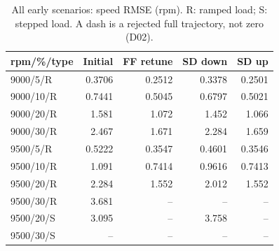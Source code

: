 \begin{table}[htbp]\centering\small\setlength{\tabcolsep}{4pt}\begin{tabular}{@{}lrrrr@{}}\toprule
rpm/\%/type & Initial & FF retune & SD down & SD up\\\midrule
9000/5/R & 0.3706 & 0.2512 & 0.3378 & 0.2501\\
9000/10/R & 0.7441 & 0.5045 & 0.6797 & 0.5021\\
9000/20/R & 1.581 & 1.072 & 1.452 & 1.066\\
9000/30/R & 2.467 & 1.671 & 2.284 & 1.659\\
9500/5/R & 0.5222 & 0.3547 & 0.4601 & 0.3546\\
9500/10/R & 1.091 & 0.7414 & 0.9616 & 0.7413\\
9500/20/R & 2.284 & 1.552 & 2.012 & 1.552\\
9500/30/R & 3.681 & -- & -- & --\\
9500/20/S & 3.095 & -- & 3.758 & --\\
9500/30/S & -- & -- & -- & --\\
\bottomrule\end{tabular}\caption{All early scenarios: speed RMSE (rpm). R: ramped load; S: stepped load. A dash is a rejected full trajectory, not zero (D02).}\label{tab:early_rmse}\end{table}